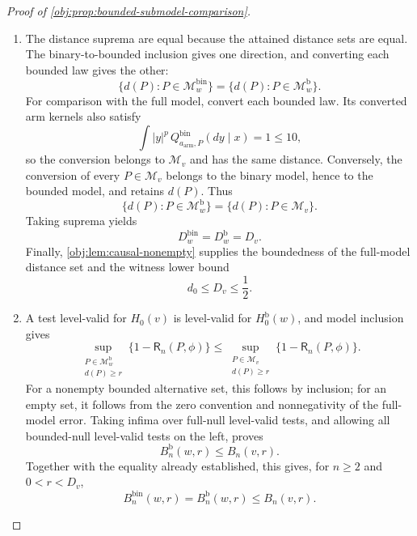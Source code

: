 \documentclass[11pt]{article}
\begin{document}
\begin{proof}[Proof of \cref{obj:prop:bounded-submodel-comparison}]
\begin{enumerate}
\item The distance suprema are equal because the attained distance sets are equal. The binary-to-bounded inclusion gives one direction, and converting each bounded law gives the other:
\[
\{d(P):P\in\mathcal M_w^{\mathrm{bin}}\}
=
\{d(P):P\in\mathcal M_w^{\mathrm b}\}.
\]
For comparison with the full model, convert each bounded law. Its converted arm kernels also satisfy
\[
\int |y|^p\,Q^{\mathrm{bin}}_{a_{\mathrm{arm}},P}(dy\mid x)
=1\le10,
\]
so the conversion belongs to \(\mathcal M_v\) and has the same distance. Conversely, the conversion of every \(P\in\mathcal M_v\) belongs to the binary model, hence to the bounded model, and retains \(d(P)\). Thus
\[
\{d(P):P\in\mathcal M_w^{\mathrm b}\}
=
\{d(P):P\in\mathcal M_v\}.
\]
Taking suprema yields
\[
D_w^{\mathrm{bin}}=D_w^{\mathrm b}=D_v.
\]
Finally, \cref{obj:lem:causal-nonempty} supplies the boundedness of the full-model distance set and the witness lower bound
\[
d_0\le D_v\le\frac12.
\]

\item A test level-valid for \(H_0(v)\) is level-valid for \(H_0^{\mathrm b}(w)\), and model inclusion gives
\[
\sup_{\substack{P\in\mathcal M_w^{\mathrm b}\\d(P)\ge r}}
\{1-\mathsf R_n(P,\phi)\}
\le
\sup_{\substack{P\in\mathcal M_v\\d(P)\ge r}}
\{1-\mathsf R_n(P,\phi)\}.
\]
For a nonempty bounded alternative set, this follows by inclusion; for an empty set, it follows from the zero convention and nonnegativity of the full-model error. Taking infima over full-null level-valid tests, and allowing all bounded-null level-valid tests on the left, proves
\[
B_n^{\mathrm b}(w,r)\le B_n(v,r).
\]
Together with the equality already established, this gives, for \(n\ge2\) and \(0<r<D_v\),
\[
B_n^{\mathrm{bin}}(w,r)=B_n^{\mathrm b}(w,r)\le B_n(v,r).
\]


\end{enumerate}
\end{proof}
\end{document}
